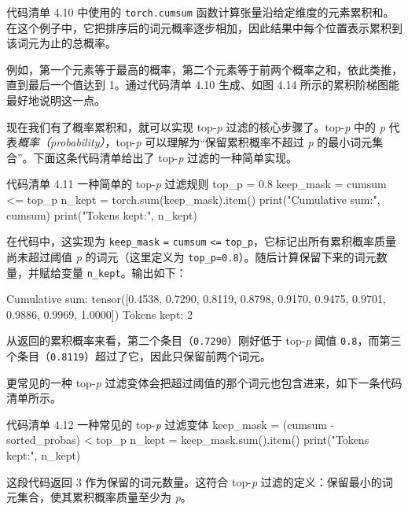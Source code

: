 代码清单 4.10 中使用的 \texttt{torch.cumsum} 函数计算张量沿给定维度的元素累积和。在这个例子中，它把排序后的词元概率逐步相加，因此结果中每个位置表示累积到该词元为止的总概率。

例如，第一个元素等于最高的概率，第二个元素等于前两个概率之和，依此类推，直到最后一个值达到 1。通过代码清单 4.10 生成、如图 4.14 所示的累积阶梯图能最好地说明这一点。


现在我们有了概率累积和，就可以实现 top-\emph{p} 过滤的核心步骤了。top-\emph{p} 中的 \emph{p} 代表\emph{概率（probability）}，top-\emph{p} 可以理解为“保留累积概率不超过 \emph{p} 的最小词元集合”。下面这条代码清单给出了 top-\emph{p} 过滤的一种简单实现。

\begin{codeboxt}{代码清单 4.11 一种简单的 top-\emph{p} 过滤规则}
top_p = 0.8
keep_mask = cumsum <= top_p
n_kept = torch.sum(keep_mask).item()
print("Cumulative sum:", cumsum)
print("Tokens kept:", n_kept)
\end{codeboxt}

在代码中，这实现为 \texttt{keep\_mask} \texttt{=} \texttt{cumsum} \texttt{\textless{}=} \texttt{top\_p}，它标记出所有累积概率质量尚未超过阈值 \emph{p} 的词元（这里定义为 \texttt{top\_p=0.8}）。随后计算保留下来的词元数量，并赋给变量 \texttt{n\_kept}。输出如下：

\begin{codebox}
Cumulative sum: tensor([0.4538, 0.7290, 0.8119, 0.8798,
0.9170, 0.9475, 0.9701, 0.9886, 0.9969, 1.0000])
Tokens kept: 2
\end{codebox}

从返回的累积概率来看，第二个条目（\texttt{0.7290}）刚好低于 top-\emph{p} 阈值 \texttt{0.8}，而第三个条目（\texttt{0.8119}）超过了它，因此只保留前两个词元。

更常见的一种 top-\emph{p} 过滤变体会把超过阈值的那个词元也包含进来，如下一条代码清单所示。

\begin{codeboxt}{代码清单 4.12 一种常见的 top-\emph{p} 过滤变体}
keep_mask = (cumsum - sorted_probas) < top_p
n_kept = keep_mask.sum().item()
print("Tokens kept:", n_kept)
\end{codeboxt}

这段代码返回 3 作为保留的词元数量。这符合 top-\emph{p} 过滤的定义：保留最小的词元集合，使其累积概率质量至少为 \emph{p}。

